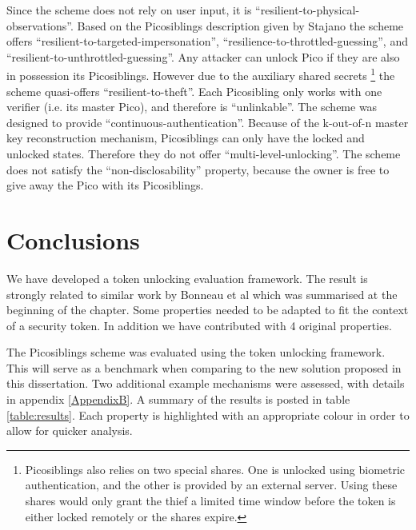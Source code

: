 %
Since the scheme does not rely on user input, it is ``resilient-to-physical-observations''. Based on the Picosiblings description given by Stajano \cite{stajano2011pico} the scheme offers ``resilient-to-targeted-impersonation'', ``resilience-to-throttled-guessing'', and ``resilient-to-unthrottled-guessing''. Any attacker can unlock Pico if they are also in possession its Picosiblings. However due to the auxiliary shared secrets \footnote{Picosiblings also relies on two special shares. One is unlocked using biometric authentication, and the other is provided by an external server. Using these shares would only grant the thief a limited time window before the token is either locked remotely or the shares expire.} the scheme quasi-offers ``resilient-to-theft''. Each Picosibling only works with one verifier (i.e. its master Pico), and therefore is ``unlinkable''. The scheme was designed to provide ``continuous-authentication''. Because of the k-out-of-n master key reconstruction mechanism, Picosiblings can only have the locked and unlocked states. Therefore they do not offer ``multi-level-unlocking''. The scheme does not satisfy the ``non-disclosability'' property, because the owner is free to give away the Pico with its Picosiblings.
	
\section{Conclusions}
We have developed a token unlocking evaluation framework. The result is strongly related to similar work by Bonneau et al \cite{bonneau2012quest} which was summarised at the beginning of the chapter. Some properties needed to be adapted to fit the context of a security token. In addition we have contributed with 4 original properties. 

The Picosiblings scheme was evaluated using the token unlocking framework. This will serve as a benchmark when comparing to the new solution proposed in this dissertation. Two additional example mechanisms were assessed, with details in appendix \ref{AppendixB}. A summary of the results is posted in table \ref{table:results}. Each property is highlighted with an appropriate colour in order to allow for quicker analysis.


